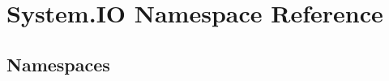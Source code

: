 \hypertarget{namespace_system_1_1_i_o}{}\section{System.\+IO Namespace Reference}
\label{namespace_system_1_1_i_o}
\subsection*{Namespaces}
\begin{DoxyCompactItemize}
\end{DoxyCompactItemize}

